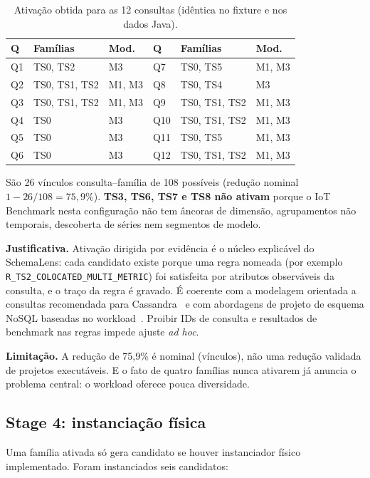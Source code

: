 \documentclass[11pt,a4paper]{article}
\newcommand{\caixa}[2][boxbg]{\par\smallskip\noindent\colorbox{#1}{\parbox{\dimexpr\linewidth-2\fboxsep}{#2}}\par\smallskip}
\newcommand{\just}[1]{\caixa{\textbf{Justificativa.} #1}}
\newcommand{\limit}[1]{\caixa[warnbg]{\textbf{Limitação.} #1}}
\begin{document}
\begin{table}[H]\centering\small
\caption{Ativação obtida para as 12 consultas (idêntica no fixture e nos dados Java).}
\begin{tabular}{@{}lll@{\qquad}lll@{}}\toprule
Q & Famílias & Mod. & Q & Famílias & Mod.\\\midrule
Q1 & TS0, TS2 & M3 & Q7 & TS0, TS5 & M1, M3\\
Q2 & TS0, TS1, TS2 & M1, M3 & Q8 & TS0, TS4 & M3\\
Q3 & TS0, TS1, TS2 & M1, M3 & Q9 & TS0, TS1, TS2 & M1, M3\\
Q4 & TS0 & M3 & Q10 & TS0, TS1, TS2 & M1, M3\\
Q5 & TS0 & M3 & Q11 & TS0, TS5 & M1, M3\\
Q6 & TS0 & M3 & Q12 & TS0, TS1, TS2 & M1, M3\\\bottomrule
\end{tabular}\end{table}

São 26 vínculos consulta--família de 108 possíveis (redução nominal $1-26/108=75{,}9\%$). \textbf{TS3, TS6, TS7 e TS8 não ativam} porque o IoT Benchmark nesta configuração não tem âncoras de dimensão, agrupamentos não temporais, descoberta de séries nem segmentos de modelo.

\just{Ativação dirigida por evidência é o núcleo explicável do SchemaLens: cada candidato existe porque uma regra nomeada (por exemplo \texttt{R\_TS2\_COLOCATED\_MULTI\_METRIC}) foi satisfeita por atributos observáveis da consulta, e o traço da regra é gravado. É coerente com a modelagem orientada a consultas recomendada para Cassandra~\cite{chebotko2015} e com abordagens de projeto de esquema NoSQL baseadas no workload~\cite{nose}. Proibir IDs de consulta e resultados de benchmark nas regras impede ajuste \emph{ad hoc}.}
\limit{A redução de 75,9\% é nominal (vínculos), não uma redução validada de projetos executáveis. E o fato de quatro famílias nunca ativarem já anuncia o problema central: o workload oferece pouca diversidade.}

\subsection{Stage 4: instanciação física}
Uma família ativada só gera candidato se houver instanciador físico implementado. Foram instanciados seis candidatos:
\end{document}
